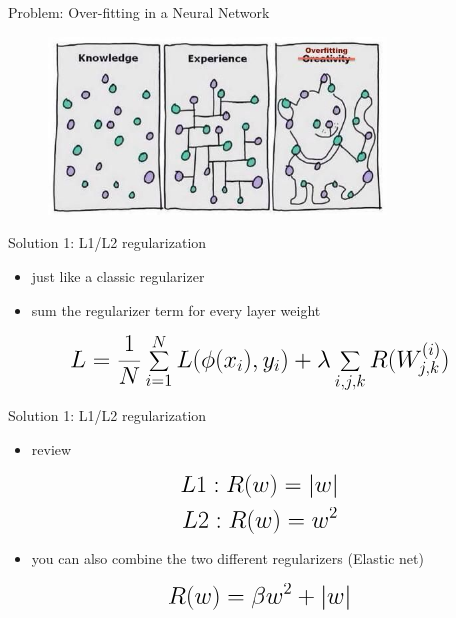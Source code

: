 \begin{frame}{Problem: Over-fitting in a Neural Network}
    \begin{figure}
        \centering
        \href{https://algotrading101.com/learn/what-is-overfitting-in-trading/}{\includegraphics[width=0.8\textwidth]{Figs/section_4/image.png}}
    \end{figure}
\end{frame}

\begin{frame}{Solution 1: L1/L2 regularization}
    \begin{itemize}
        \item just like a classic regularizer
        \item sum the regularizer term for every layer weight
    \end{itemize}
    \vspace{0.2\textheight}
    \begin{equation*}
        \mathlarger{\mathlarger{\mathlarger{
        L = \frac{1}{N} \sum_{i=1}^{N} L(\phi(x_i), y_i) + \lambda \sum_{i,j,k} R(W_{j,k}^{(i)})
        }}}
    \end{equation*}
\end{frame}
\begin{frame}{Solution 1: L1/L2 regularization}
    \begin{itemize}
        \item review
    \end{itemize}
    \vspace{0.1\textheight}
    \begin{equation*}
        \mathlarger{\mathlarger{\mathlarger{
            L1: R(w) = \vert w\vert
        }}}
    \end{equation*}
    \begin{equation*}
        \mathlarger{\mathlarger{\mathlarger{
            L2: R(w) = w^2
        }}}
    \end{equation*}
    \begin{itemize}
        \item you can also combine the two different regularizers (Elastic net)
    \end{itemize}
    \begin{equation*}
        \mathlarger{\mathlarger{\mathlarger{
        R(w) = \beta w^2 + \vert w\vert
        }}}
    \end{equation*}
\end{frame}

